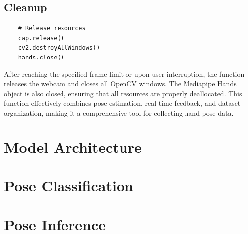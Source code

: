 \subsection{Cleanup}
\begin{lstlisting}
	# Release resources
	cap.release()
	cv2.destroyAllWindows()
	hands.close()
\end{lstlisting}
After reaching the specified frame limit or upon user interruption, the function releases the webcam and closes all OpenCV windows. The Mediapipe Hands object is also closed, ensuring that all resources are properly deallocated. This function effectively combines pose estimation, real-time feedback, and dataset organization, making it a comprehensive tool for collecting hand pose data.
\section{Model Architecture}


\section{Pose Classification}
\section{Pose Inference}